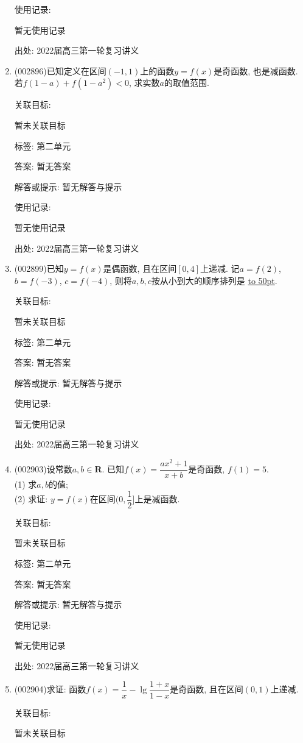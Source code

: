 \documentclass[10pt,a4paper]{article}
\newcommand{\blank}[1]{\underline{\hbox to #1pt{}}}
\begin{document}
\begin{enumerate}[1.]
使用记录:

暂无使用记录


出处: 2022届高三第一轮复习讲义
\item { (002896)}已知定义在区间$(-1,1)$上的函数$y=f(x)$是奇函数, 也是减函数. 若$f(1-a)+f(1-a^2)<0$, 求实数$a$的取值范围.


关联目标:

暂未关联目标



标签: 第二单元

答案: 暂无答案

解答或提示: 暂无解答与提示

使用记录:

暂无使用记录


出处: 2022届高三第一轮复习讲义
\item { (002899)}已知$y=f(x)$是偶函数, 且在区间$[0,4]$上递减. 记$a=f(2)$, $b=f(-3)$, $c=f(-4)$, 则将$a,b,c$按从小到大的顺序排列是	\blank{50}.


关联目标:

暂未关联目标



标签: 第二单元

答案: 暂无答案

解答或提示: 暂无解答与提示

使用记录:

暂无使用记录


出处: 2022届高三第一轮复习讲义
\item { (002903)}设常数$a,b\in \mathbf{R}$. 已知$f(x)=\dfrac{ax^2+1}{x+b}$是奇函数, $f(1)=5$.\\
(1) 求$a,b$的值;\\
(2) 求证: $y=f(x)$在区间$(0,\dfrac 12]$上是减函数.


关联目标:

暂未关联目标



标签: 第二单元

答案: 暂无答案

解答或提示: 暂无解答与提示

使用记录:

暂无使用记录


出处: 2022届高三第一轮复习讲义
\item { (002904)}求证: 函数$f(x)=\dfrac 1x-\lg\dfrac{1+x}{1-x}$是奇函数, 且在区间$(0,1)$上递减.


关联目标:

暂未关联目标




\end{enumerate}
\end{document}
